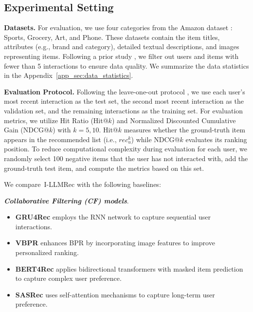 \documentclass[sigconf]{acmart}
\newcommand{\proposed}{\textsf{I-LLMRec}}
\begin{document}
\subsection{Experimental Setting}

\noindent \textbf{Datasets.} For evaluation, we use four categories from the Amazon dataset \cite{ni2019justifying}: Sports, Grocery, Art, and Phone. These datasets contain the item titles, attributes (e.g., brand and category), detailed textual descriptions, and images representing items. Following a prior study \cite{wei2024towards}, we filter out users and items with fewer than 5 interactions to ensure data quality. We summarize the data statistics in the Appendix~\ref{app_sec:data_statistics}.

\smallskip
\noindent \textbf{Evaluation Protocol.}
Following the leave-one-out protocol \cite{kim2023melt,kang2018self}, we use each user's most recent interaction as the test set, the second most recent interaction as the validation set, and the remaining interactions as the training set. For evaluation metrics, we utilize Hit Ratio (Hit@$k$) and Normalized Discounted Cumulative Gain (NDCG@$k$) with $k=5,10$. Hit@$k$ measures whether the ground-truth item appears in the recommended list (i.e., $rec_u^k$) while NDCG@$k$ evaluates its ranking position. To reduce computational complexity during evaluation for each user, we randomly select 100 negative items that the user has not interacted with, add the ground-truth test item, and compute the metrics based on this set.



\smallskip
{}
We compare~\proposed{} with the following baselines:

\smallskip
\textbf{\textit{Collaborative Filtering (CF) models}}.
\begin{itemize}[leftmargin=5mm]
    \item \textbf{GRU4Rec} \cite{hidasi2015session} employs the RNN network to capture sequential user interactions.
    \item \textbf{VBPR} \cite{he2016vbpr} enhances BPR \cite{rendle2012bpr} by incorporating image features to improve personalized ranking.
    \item \textbf{BERT4Rec} \cite{sun2019bert4rec} applies bidirectional transformers with masked item prediction to capture complex user preference.
    \item \textbf{SASRec} uses self-attention mechanisms to capture long-term user preference.
\end{itemize} 
\end{document}
